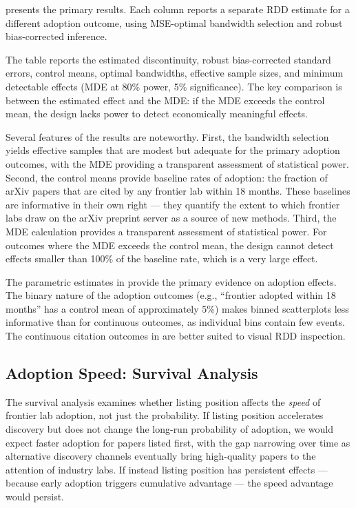 \documentclass[12pt]{article}
\begin{document}
 presents the primary results. Each column reports a separate RDD estimate for a different adoption outcome, using MSE-optimal bandwidth selection and robust bias-corrected inference.


  


The table reports the estimated discontinuity, robust bias-corrected standard errors, control means, optimal bandwidths, effective sample sizes, and minimum detectable effects (MDE at 80\% power, 5\% significance). The key comparison is between the estimated effect and the MDE: if the MDE exceeds the control mean, the design lacks power to detect economically meaningful effects.

Several features of the results are noteworthy. First, the bandwidth selection yields effective samples that are modest but adequate for the primary adoption outcomes, with the MDE providing a transparent assessment of statistical power. Second, the control means provide baseline rates of adoption: the fraction of arXiv papers that are cited by any frontier lab within 18 months. These baselines are informative in their own right --- they quantify the extent to which frontier labs draw on the arXiv preprint server as a source of new methods. Third, the MDE calculation provides a transparent assessment of statistical power. For outcomes where the MDE exceeds the control mean, the design cannot detect effects smaller than 100\% of the baseline rate, which is a very large effect.

The parametric estimates in  provide the primary evidence on adoption effects. The binary nature of the adoption outcomes (e.g., ``frontier adopted within 18 months'' has a control mean of approximately 5\%) makes binned scatterplots less informative than for continuous outcomes, as individual bins contain few events. The continuous citation outcomes in  are better suited to visual RDD inspection.

\subsection{Adoption Speed: Survival Analysis}

The survival analysis examines whether listing position affects the \textit{speed} of frontier lab adoption, not just the probability. If listing position accelerates discovery but does not change the long-run probability of adoption, we would expect faster adoption for papers listed first, with the gap narrowing over time as alternative discovery channels eventually bring high-quality papers to the attention of industry labs. If instead listing position has persistent effects --- because early adoption triggers cumulative advantage \citep{merton1968} --- the speed advantage would persist.
\end{document}
